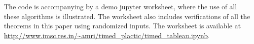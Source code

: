 \documentclass[10pt]{amsproc}
\theoremstyle{definition}
\theoremstyle{remark}
\begin{document}
The code is accompanying by a demo jupyter worksheet, where the use of all these algorithms is illustrated.
The worksheet also includes verifications of all the theorems in this paper using randomized inputs.
The worksheet is available at \url{http://www.imsc.res.in/~amri/timed_plactic/timed_tableau.ipynb}.


\end{document}
